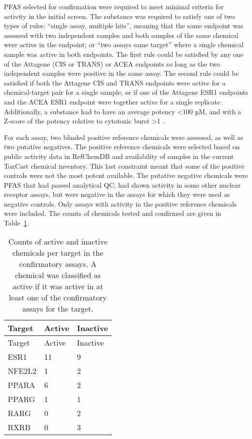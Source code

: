 \documentclass[
  super,
  preprint,
  3p]{elsarticle}
\begin{document}
PFAS selected for confirmation were required to meet minimal criteria
for activity in the initial screen. The substance was required to
satisfy one of two types of rules: ``single assay, multiple hits'',
meaning that the same endpoint was assessed with two independent samples
and both samples of the same chemical were active in the endpoint; or
``two assays same target'' where a single chemical sample was active in
both endpoints. The first rule could be satisfied by any one of the
Attagene (CIS or TRANS) or ACEA endpoints so long as the two independent
samples were positive in the same assay. The second rule could be
satisfied if both the Attagene CIS and TRANS endpoints were active for a
chemical-target pair for a single sample, or if one of the Attagene ESR1
endpoints and the ACEA ESR1 endpoint were together active for a single
replicate. Additionally, a substance had to have an average potency
\textless100 µM, and with a Z-score of the potency relative to cytotoxic
burst \textgreater1 \citep{judson_editors_2016}.

For each assay, two blinded positive reference chemicals were assessed,
as well as two putative negatives. The positive reference chemicals were
selected based on public activity data in RefChemDB
\citep{judson_workflow_2019} and availability of samples in the current
ToxCast chemical inventory. This last constraint meant that some of the
positive controls were not the most potent available. The putative
negative chemicals were PFAS that had passed analytical QC, had shown
activity in some other nuclear receptor assays, but were negative in the
assays for which they were used as negative controls. Only assays with
activity in the positive reference chemicals were included. The counts
of chemicals tested and confirmed are given in Table~\ref{tbl-eurofins}.

\hypertarget{tbl-eurofins}{}
\begin{longtable}[]{@{}lll@{}}
\caption{\label{tbl-eurofins}Counts of active and inactive chemicals per
target in the confirmatory assays. A chemical was classified as active
if it was active in at least one of the confirmatory assays for the
target.}\tabularnewline
\toprule\noalign{}
Target & Active & Inactive \\
\midrule\noalign{}
\endfirsthead
\toprule\noalign{}
Target & Active & Inactive \\
\midrule\noalign{}
\endhead
\bottomrule\noalign{}
\endlastfoot
ESR1 & 11 & 9 \\
NFE2L2 & 1 & 2 \\
PPARA & 6 & 2 \\
PPARG & 1 & 1 \\
RARG & 0 & 2 \\
RXRB & 0 & 3 \\
\end{longtable}
\end{document}
